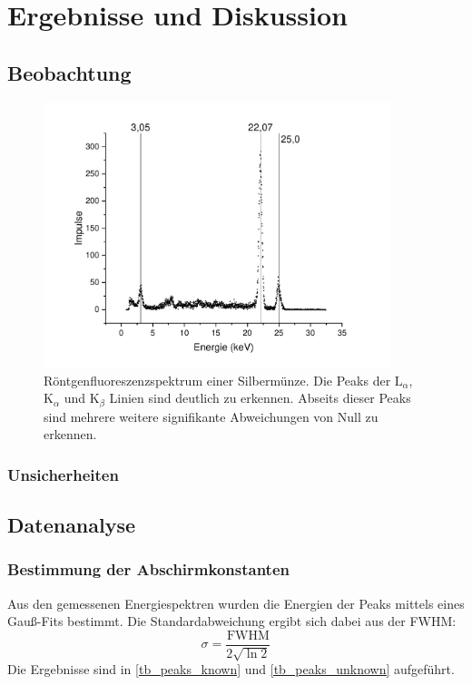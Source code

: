 \documentclass[
	a4paper,
	12pt,
	pagesize,
	ngerman
]{scrartcl}
\begin{document}
	\section{Ergebnisse und Diskussion}
	

	\subsection{Beobachtung}
	
	\begin{figure}[H] %
		\includegraphics[width=0.9\textwidth]{images/Silbermuenze}
		\centering
		\caption{Röntgenfluoreszenzspektrum einer Silbermünze. Die Peaks der $\text{L}_\alpha$, $\text{K}_\alpha$ und $\text{K}_\beta$ Linien sind deutlich zu erkennen. Abseits dieser Peaks sind mehrere weitere signifikante Abweichungen von Null zu erkennen.} %
		\label{fig_ag_plot}
		\centering
	\end{figure} %
	
	\subsubsection{Unsicherheiten} %
	\subsection{Datenanalyse}
	\subsubsection{Bestimmung der Abschirmkonstanten}
	Aus den gemessenen Energiespektren wurden die Energien der Peaks mittels eines Gauß-Fits bestimmt.
	Die Standardabweichung ergibt sich dabei aus der FWHM: %
	\begin{equation}
		\sigma = \frac{\text{FWHM}}{2\sqrt{\ln 2}}
	\end{equation}
	Die Ergebnisse sind in \cref{tb_peaks_known} und \cref{tb_peaks_unknown} aufgeführt.
	
\end{document}
